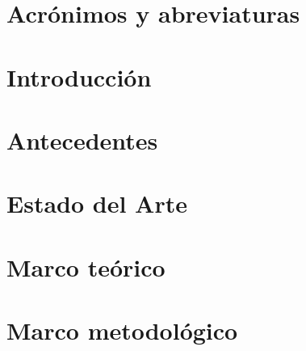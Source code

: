 \documentclass[12pt, oneside]{report}
\begin{document}
\chapter*{Acrónimos y abreviaturas}

\cleardoublepage

\chapter*{Introducción}


\chapter{Antecedentes}
\label{cap:antecedentes}


\chapter{Estado del Arte}
\label{cap:estado_arte}


\chapter{Marco teórico}
\label{cap:marco_teorico}


\chapter{Marco metodológico}
\label{cap:marco_metodologico}

\end{document}
